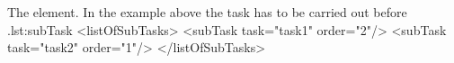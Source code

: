 \begin{myXmlLst}{The  element. In the example above the task  has to be carried out before .}{lst:subTask}
  <listOfSubTasks>
    <subTask task="task1" order="2"/> 
    <subTask task="task2" order="1"/> 
  </listOfSubTasks>
\end{myXmlLst}

 


